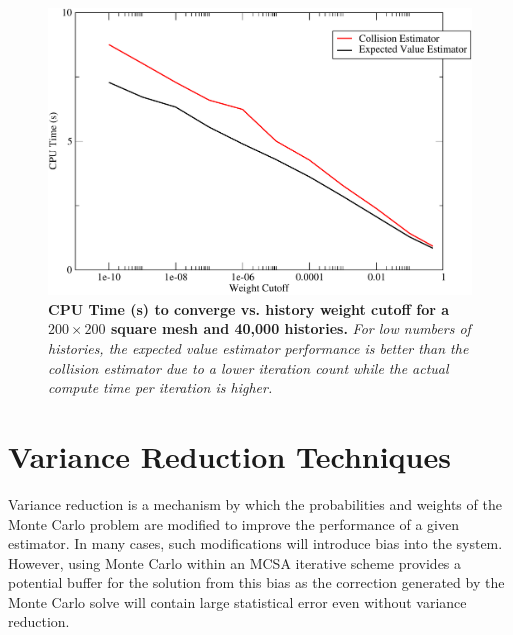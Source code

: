 \begin{figure}[t!]
  \centering
  \includegraphics[width=5in,clip]{chapters/mc_background/estimator_wc_time.pdf}
  \caption{\textbf{CPU Time (s) to converge vs. history weight cutoff
      for a $200 \times 200$ square mesh and 40,000 histories.}
    \textit{For low numbers of histories, the expected value estimator
      performance is better than the collision estimator due to a
      lower iteration count while the actual compute time per
      iteration is higher.}}
  \label{fig:estimator_wc_time}
\end{figure}

\clearpage

\section{Variance Reduction Techniques}
\label{sec:variance_reduction}
Variance reduction is a mechanism by which the probabilities and
weights of the Monte Carlo problem are modified to improve the
performance of a given estimator. In many cases, such modifications
will introduce bias into the system. However, using Monte Carlo within
an MCSA iterative scheme provides a potential buffer for the solution
from this bias as the correction generated by the Monte Carlo solve
will contain large statistical error even without variance reduction.

